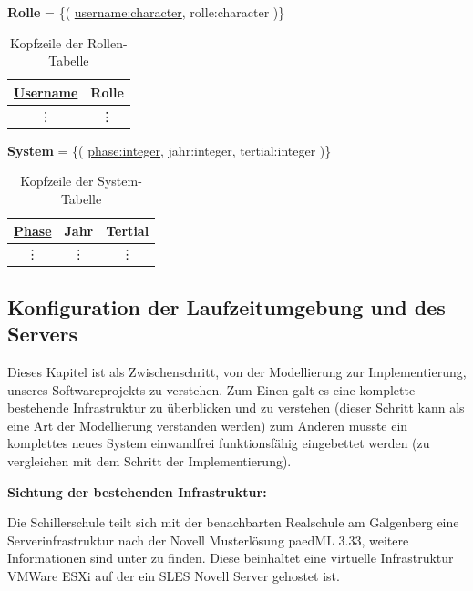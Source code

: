 \textbf{Rolle} = \{( \underline{username:character}, rolle:character )\}

\begin{table}[H]
\begin{center}
	\begin{tabular}{|c|c|}\hline
		\textbf{\underline{Username}} & \textbf{Rolle} \\ \hline
		\vdots & \vdots \\
	\end{tabular}
	\caption{Kopfzeile der Rollen-Tabelle}
\end{center}
\end{table}

\textbf{System} = \{( \underline{phase:integer}, jahr:integer, tertial:integer )\}

\begin{table}[H]
\begin{center}
	\begin{tabular}{|c|c|c|}\hline
		\textbf{\underline{Phase}} & \textbf{Jahr} & \textbf{Tertial} \\ \hline
		\vdots & \vdots & \vdots \\
	\end{tabular}
	\caption{Kopfzeile der System-Tabelle}
\end{center}
\end{table}

\subsection{Konfiguration der Laufzeitumgebung und des Servers}\label{subsec:Konfiguration der Laufzeitumgebung und des Server}

Dieses Kapitel ist als Zwischenschritt, von der Modellierung zur Implementierung, unseres Softwareprojekts zu verstehen.
Zum Einen galt es eine komplette bestehende Infrastruktur zu überblicken und zu verstehen (dieser Schritt kann als eine Art der Modellierung verstanden werden)
zum Anderen musste ein komplettes neues System einwandfrei funktionsfähig eingebettet werden (zu vergleichen mit dem Schritt der Implementierung).

\textbf{Sichtung der bestehenden Infrastruktur:}

Die Schillerschule teilt sich mit der benachbarten Realschule am Galgenberg eine Serverinfrastruktur nach der Novell Musterlösung paedML 3.33, weitere Informationen sind unter \cite{paedML} zu finden. %
Diese beinhaltet eine virtuelle Infrastruktur \gls{VMWare} ESXi auf der ein \ac{SLES} Novell Server gehostet ist.

